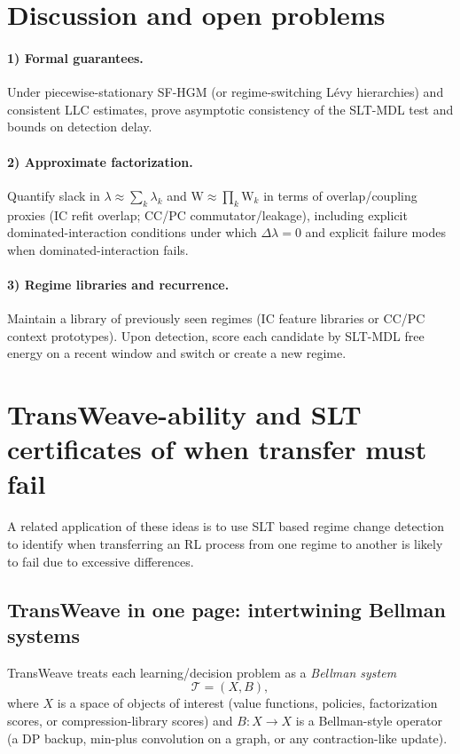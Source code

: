 \documentclass[11pt]{article}
\newcommand{\weak}{\mathrm{W}}  %
\begin{document}
\section{Discussion and open problems}
\paragraph{1) Formal guarantees.}
Under piecewise-stationary SF-HGM (or regime-switching L\'evy hierarchies) and consistent LLC estimates,
prove asymptotic consistency of the SLT-MDL test and bounds on detection delay.

\paragraph{2) Approximate factorization.}
Quantify slack in $\lambda \approx \sum_k \lambda_k$ and $\weak \approx \prod_k \weak_k$ in terms of
overlap/coupling proxies (IC refit overlap; CC/PC commutator/leakage), including explicit dominated-interaction
conditions under which $\Delta\lambda=0$ and explicit failure modes when dominated-interaction fails.

\paragraph{3) Regime libraries and recurrence.}
Maintain a library of previously seen regimes (IC feature libraries or CC/PC context prototypes).
Upon detection, score each candidate by SLT-MDL free energy on a recent window and switch or create a new regime.

\section{TransWeave-ability and SLT certificates of when transfer must fail}
\label{sec:transweave_slt}

A related application of these ideas is to use SLT based regime change detection to identify when transferring an RL process from one regime to another is likely to fail due to excessive differences.

\subsection{TransWeave in one page: intertwining Bellman systems}
TransWeave treats each learning/decision problem as a \emph{Bellman system}
\[
\mathcal{T} = (X, B),
\]
where $X$ is a space of objects of interest (value functions, policies, factorization scores, or
compression-library scores) and $B : X \to X$ is a Bellman-style operator (a DP backup, min-plus
convolution on a graph, or any contraction-like update).
\end{document}
